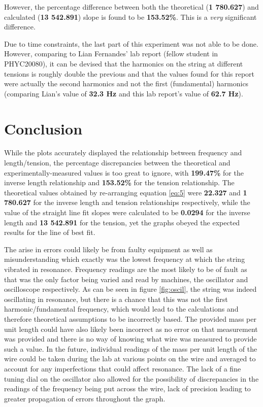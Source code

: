 \documentclass[12pt]{article}
\begin{document}
However, the percentage difference between both the theoretical (\textbf{1 780.627}) and calculated (\textbf{13 542.891}) slope is found to be \textbf{153.52\%}. This is a \textit{very} significant difference.

Due to time constraints, the last part of this experiment was not able to be done. However, comparing to Lian Fernandes' lab report (fellow student in PHYC20080), it can be devised
that the harmonics on the string at different tensions is roughly double the previous and that the values found for this report were actually the second harmonics and not the first (fundamental)
harmonics (comparing Lian's value of \textbf{32.3 Hz} and this lab report's value of \textbf{62.7 Hz}).

\vspace{2cm}

\section{Conclusion} \label{sec:4}

While the plots accurately displayed the relationship between frequency and length/tension, the percentage discrepancies between the theoretical and experimentally-measured values is too great to ignore,
with \textbf{199.47\%} for the inverse length relationship and \textbf{153.52\%} for the tension relationship.
The theoretical values obtained by re-arranging equation \ref{eq:5} were \textbf{22.327} and \textbf{1 780.627} for the inverse length and tension relationships respectively, while the value of the straight line fit slopes
were calculated to be \textbf{0.0294} for the inverse length and \textbf{13 542.891} for the tension, yet the graphs obeyed the expected results for the line of best fit.

The arise in errors could likely be from faulty equipment as well as misunderstanding which exactly was the lowest frequency at which the string vibrated in resonance. Frequency readings are the most likely
to be of fault as that was the only factor being varied and read by machines, the oscillator and oscilloscope respectively. As can be seen in figure \ref{fig:oscil}, the string was indeed oscillating in resonance, but there is a chance
that this was not the first harmonic/fundamental frequency, which would lead to the calculations and therefore theoretical assumptions to be incorrectly based.
The provided mass per unit length could have also likely been incorrect as no error on that measurement was provided and there is no way of knowing what wire was measured to provide such a value.
In the future, individual readings of the mass per unit length of the wire could be taken during the lab at various points on the wire and averaged to account for any imperfections that could affect resonance.
The lack of a fine tuning dial on the oscillator also allowed for the possibility of discrepancies in the readings of the frequency being put across the wire, lack of precision leading to greater propagation of errors
throughout the graph.
\end{document}
